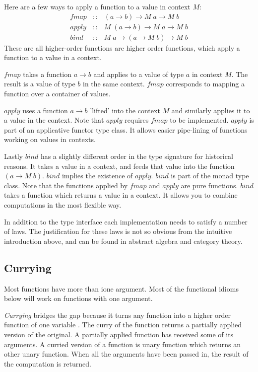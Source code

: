 \documentclass[12pt,fleqn]{article}
\begin{document}
Here are a few ways to apply a function to a value in context $M$:
\begin{eqnarray*}
fmap  &::& (a \rightarrow b) \rightarrow M\;a \rightarrow M \;b \\
apply &::& M \; (a \rightarrow b) \rightarrow M\;a \rightarrow M \;b \\
bind  &::& M \; a \rightarrow (a \rightarrow M\; b) \rightarrow M \; b
\end{eqnarray*}
These are all higher-order functions are higher order functions, which apply a function to a value in a context.

$fmap$ takes a function $a \rightarrow b$ and applies to a value of type $a$ in context $M$. 
The result is a value of type $b$ in the same context.
$fmap$ corresponds to mapping a function over a container of values.

$apply$ uses a function $a \rightarrow b$ 'lifted' into the context $M$ and similarly applies it to a value in the context.
Note that $apply$ requires $fmap$ to be implemented.
$apply$ is part of an applicative functor type class.
It allows easier pipe-lining of functions working on values in contexts.

Lastly $bind$ has a slightly different order in the type signature for historical reasons. 
It takes a value in a context, and feeds that value into the function $(a \rightarrow M\; b)$.
$bind$ implies the existence of $apply$.
$bind$ is part of the monad type class. 
Note that the functions applied by $fmap$ and $apply$ are pure functions. $bind$ takes a function which returns a value in a context.
It allows you to combine computations in the most flexible way.

In addition to the type interface each implementation needs to satisfy a number of laws.
The justification for these laws is not so obvious from the intuitive introduction above, and can be found in abstract algebra and category theory.

%
%
%
\subsection{Currying}
%
%
%

Most functions have more than ione argument.
Most of the functional idioms below will work on functions with one argument.

{\em Currying} bridges the gap because it  turns any function into a higher order function of one variable \cite{field}.
The curry of the function returns a partially applied version of the original.
A partially applied function has received some of its arguments. 
A curried version of a function is unary function which returns an other unary function. 
When all the arguments have been passed in, the result of the computation is returned.
\end{document}

